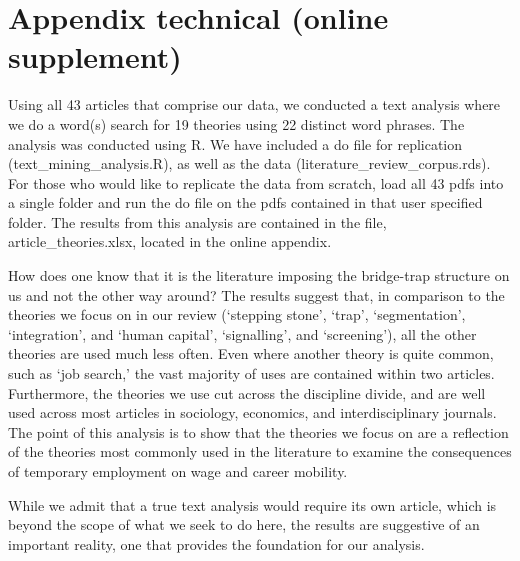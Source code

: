 \clearpage
\section{Appendix technical (online supplement)}
\label{appendix_technical}

Using all 43 articles that comprise our data, we conducted a text analysis where we do a word(s) search for 19 theories using 22 distinct word phrases.  The analysis was conducted using R.  We have included a do file for replication (text\_mining\_analysis.R), as well as the data (literature\_review\_corpus.rds).  For those who would like to replicate the data from scratch, load all 43 pdfs into a single folder and run the do file on the pdfs contained in that user specified folder.  The results from this analysis are contained in the file, article\_theories.xlsx, located in the online appendix.  

How does one know that it is the literature imposing the bridge-trap structure on us and not the other way around?  The results suggest that, in comparison to the theories we focus on in our review (`stepping stone', `trap', `segmentation', `integration', and `human capital', `signalling', and `screening'), all the other theories are used much less often.  Even where another theory is quite common, such as `job search,' the vast majority of uses are contained within two articles.  Furthermore, the theories we use cut across the discipline divide, and are well used across most articles in sociology, economics, and interdisciplinary journals.  The point of this analysis is to show that the theories we focus on are a reflection of the theories most commonly used in the literature to examine the consequences of temporary employment on wage and career mobility.

While we admit that a true text analysis would require its own article, which is beyond the scope of what we seek to do here, the results are suggestive of an important reality, one that provides the foundation for our analysis.  


